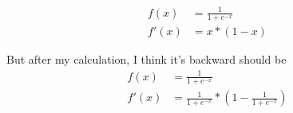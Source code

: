 \documentclass[conference]{IEEEtran}
\begin{document}
    \begin{equation}
        \begin{aligned}
            f(x) &= \frac{1}{1 + e^{-x}} \\
            f'(x) &= x * (1 - x)
        \end{aligned}
    \end{equation}
    
    But after my calculation, I think it's backward should be 
    \begin{equation}
        \begin{aligned}
            f(x) &= \frac{1}{1 + e^{-x}} \\
            f'(x) &= \frac{1}{1 + e^{-x}} * (1 - \frac{1}{1 + e^{-x}})
        \end{aligned}
    \end{equation}
    
\end{document}
